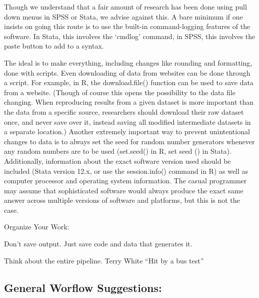 \documentclass[12pt] {article}
\begin{document}
Though we understand that a fair amount of research has been done using
pull down menus in SPSS or Stata, we advise against this. A bare minimum
if one insists on going this route is to use the built-in
command-logging features of the software. In Stata, this involves the
`cmdlog' command, in SPSS, this involves the paste button to add to a
syntax.

The ideal is to make everything, including changes like rounding and
formatting, done with scripts. Even downloading of data from websites
can be done through a script. For example, in R, the download.file()
function can be used to save data from a website. (Though of course this
opens the possibility to the data file changing. When reproducing
results from a given dataset is more important than the data from a
specific source, researchers should download their raw dataset once, and
never save over it, instead saving all modified intermediate datasets in
a separate location.) Another extremely important way to prevent
unintentional changes to data is to always set the seed for random
number generators whenever any random numbers are to be used (set.seed()
in R, set seed () in Stata). Additionally, information about the exact
software version used should be included (Stata version 12.x, or use the
session.info() command in R) as well as computer processor and operating
system information. The casual programmer may assume that sophisticated
software would always produce the exact same answer across multiple
versions of software and platforms, but this is not the case.

Organize Your Work:

Don't save output. Just save code and data that generates it.

Think about the entire pipeline. Terry White ``Hit by a bus test''

\subsection{General Worflow
Suggestions:}\label{general-worflow-suggestions}
\end{document}
